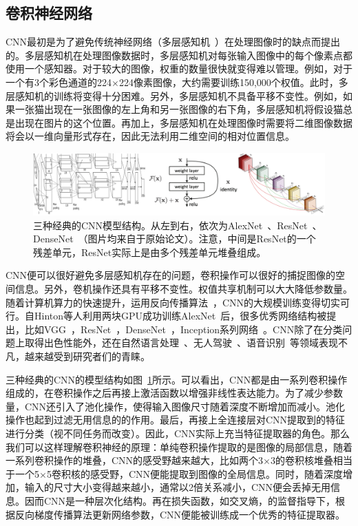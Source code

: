 \subsection{卷积神经网络}\label{subsec:cnn_introduction}
CNN最初是为了避免传统神经网络（多层感知机~\cite{gardner1998artificial}）在处理图像时的缺点而提出的。多层感知机在处理图像数据时，多层感知机对每张输入图像中的每个像素点都使用一个感知器。对于较大的图像，权重的数量很快就变得难以管理。例如，对于一个有3个彩色通道的224$\times$224像素图像，大约需要训练150,000个权值。此时，多层感知机的训练将变得十分困难。另外，多层感知机不具备平移不变性。例如，如果一张猫出现在一张图像的左上角和另一张图像的右下角，多层感知机将假设猫总是出现在图片的这个位置。再加上，多层感知机在处理图像时需要将二维图像数据将会以一维向量形式存在，因此无法利用二维空间的相对位置信息。
\begin{figure}[h]
	\centering
	\includegraphics[width=1.0\textwidth]{figure/popular_networks}
	\caption{三种经典的CNN模型结构。从左到右，依次为AlexNet~\cite{krizhevsky2012imagenet}、ResNet~\cite{he2016deep, he2016identity}、DenseNet~\cite{huang2017densely}（图片均来自于原始论文）。注意，中间是ResNet的一个残差单元，ResNet实际上是由多个残差单元堆叠组成。} 
	\label{fig:popular_networks}
\end{figure}

CNN便可以很好避免多层感知机存在的问题，卷积操作可以很好的捕捉图像的空间信息。另外，卷机操作还具有平移不变性。权值共享机制可以大大降低参数量。随着计算机算力的快速提升，运用反向传播算法~\cite{hecht1992theory}，CNN的大规模训练变得切实可行。自Hinton等人利用两块GPU成功训练AlexNet~\cite{krizhevsky2012imagenet}后，很多优秀网络结构被提出，比如VGG~\cite{simonyan2014very}，ResNet~\cite{he2016deep, he2016identity}，DenseNet~\cite{huang2017densely}，Inception系列网络~\cite{szegedy2015going, szegedy2016rethinking, szegedy2017inception}。CNN除了在分类问题上取得出色性能外，还在自然语言处理~\cite{dos2014deep, mou2016convolutional, li2019knowledge}、无人驾驶~\cite{lee2017deep, csillik2018identification, tang2017vehicle}、语音识别~\cite{abdel2013exploring, swietojanski2014convolutional, robertson2019exploring}等领域表现不凡，越来越受到研究者们的青睐。

三种经典的CNN的模型结构如图~\ref{fig:popular_networks}所示。可以看出，CNN都是由一系列卷积操作组成的，在卷积操作之后再接上激活函数以增强非线性表达能力。为了减少参数量，CNN还引入了池化操作，使得输入图像尺寸随着深度不断增加而减小。池化操作也起到过滤无用信息的的作用。最后，再接上全连接层对CNN提取到的特征进行分类（视不同任务而改变）。因此，CNN实际上充当特征提取器的角色。那么我们可以这样理解卷积神经的原理：单纯卷积操作提取的是图像的局部信息，随着一系列卷积操作的堆叠，CNN的感受野越来越大，比如两个3$\times$3的卷积核堆叠相当于一个5$\times$5卷积核的感受野，CNN便能提取到图像的全局信息。同时，随着深度增加，输入的尺寸大小变得越来越小，通常以2倍关系减小，CNN便会丢掉无用信息。因而CNN是一种层次化结构。再在损失函数，如交叉熵，的监督指导下，根据反向梯度传播算法更新网络参数，CNN便能被训练成一个优秀的特征提取器。

